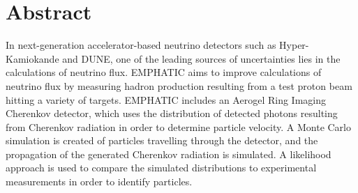 
\chapter{Abstract}

In next-generation accelerator-based neutrino detectors such as Hyper-Kamiokande and DUNE, one of the leading sources of uncertainties lies in the calculations of neutrino flux.
 \ac{EMPHATIC} aims to improve calculations of neutrino flux by measuring hadron production resulting from a test proton beam hitting a variety of targets.
\ac{EMPHATIC} includes an Aerogel Ring Imaging Cherenkov detector, which uses the distribution of detected photons resulting from Cherenkov radiation in order to determine particle velocity.
A Monte Carlo simulation is created of particles travelling through the detector, and the propagation of the generated Cherenkov radiation is simulated.
A likelihood approach is used to compare the simulated distributions to experimental measurements in order to identify particles.

\vfill
\begin{center}
\begin{sf}
\end{sf}
\end{center}
